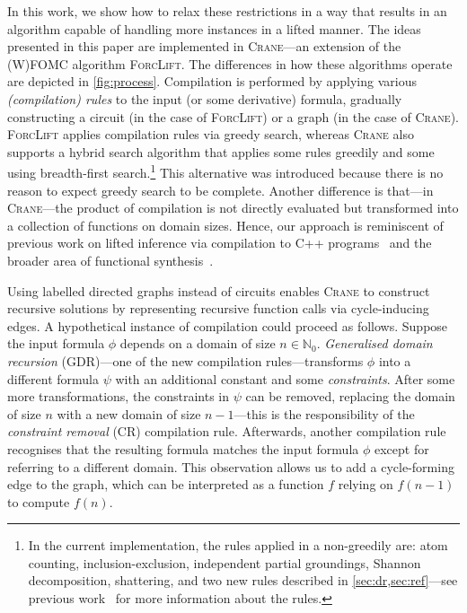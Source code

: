 \documentclass{article}
\begin{document}


In this work, we show how to relax these restrictions in a way that results in
an algorithm capable of handling more instances in a lifted manner. The ideas
presented in this paper are implemented in \textsc{Crane}---an extension of the
(W)FOMC algorithm \textsc{ForcLift}. The differences in how these algorithms
operate are depicted in \cref{fig:process}. Compilation is performed by applying
various \emph{(compilation) rules} to the input (or some derivative) formula,
gradually constructing a circuit (in the case of \textsc{ForcLift}) or a graph
(in the case of \textsc{Crane}). \textsc{ForcLift} applies compilation rules via
greedy search, whereas \textsc{Crane} also supports a hybrid search algorithm
that applies some rules greedily and some using breadth-first
search.\footnote{In the current implementation, the rules applied in a
  non-greedily are: atom counting, inclusion-exclusion, independent partial
  groundings, Shannon decomposition, shattering, and two new rules described in
  \cref{sec:dr,sec:ref}---see previous work~\cite{DBLP:conf/ijcai/BroeckTMDR11}
  for more information about the rules.} This alternative was introduced because
there is no reason to expect greedy search to be complete. Another difference is
that---in \textsc{Crane}---the product of compilation is not directly evaluated
but transformed into a collection of functions on domain sizes. Hence, our
approach is reminiscent of previous work on lifted inference via compilation to
C++ programs~\cite{DBLP:conf/kr/KazemiP16} and the broader area of functional
synthesis~\cite{DBLP:conf/cav/GoliaRM20,DBLP:conf/pldi/KuncakMPS10,sanathanan1963transfer}.


Using labelled directed graphs instead of circuits enables \textsc{Crane} to
construct recursive solutions by representing recursive function calls via
cycle-inducing edges. A hypothetical instance of compilation could proceed as
follows. Suppose the input formula $\phi$ depends on a domain of size
$n \in \mathbb{N}_{0}$. \emph{Generalised domain recursion} (GDR)---one of the
new compilation rules---transforms $\phi$ into a different formula $\psi$ with
an additional constant and some \emph{constraints}. After some more
transformations, the constraints in $\psi$ can be removed, replacing the domain
of size $n$ with a new domain of size $n-1$---this is the responsibility of the
\emph{constraint removal} (CR) compilation rule. Afterwards, another compilation
rule recognises that the resulting formula matches the input formula $\phi$
except for referring to a different domain. This observation allows us to add a
cycle-forming edge to the graph, which can be interpreted as a function $f$
relying on $f(n-1)$ to compute $f(n)$.
\end{document}
